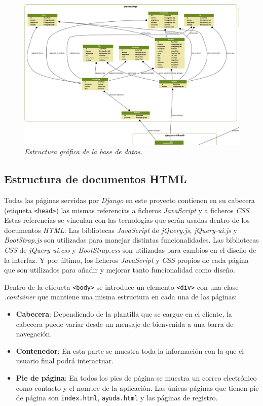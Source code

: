 \documentclass[a4paper, 12pt]{book}
\begin{document}
\begin{figure}
  \centering
  \includegraphics[width=17cm, keepaspectratio]{img/mis_modelos}
  \caption{\textit{Estructura gr\'afica de la base de datos.}}
  \label{fig:disenobbdd}
\end{figure}


\subsection{Estructura de documentos HTML} 
\label{sec:estructurahtml}
Todas las p\'aginas servidas por \textit{Django} en este proyecto contienen en su cabecera (etiqueta \texttt{<head>}) las mismas referencias a ficheros 
\textit{JavaScript} y a ficheros \textit{CSS}. Estas referencias se vinculan con las tecnolog\'ias que ser\'an usadas dentro de los documentos \textit{HTML}:
Las bibliotecas \textit{JavaScript} de \textit{jQuery.js}, \textit{jQuery-ui.js} y \textit{BootStrap.js} son utilizadas para manejar distintas 
funcionalidades. Las bibliotecas \textit{CSS} de \textit{jQuery-ui.css} y \textit{BootStrap.css} son utilizadas para cambios en el dise\~no de la interfaz. 
Y por \'ultimo, los ficheros \textit{JavaScript} y \textit{CSS} propios de cada p\'agina que son utilizados para a\~nadir y mejorar tanto funcionalidad 
como dise\~no.

Dentro de la etiqueta \texttt{<body>} se introduce un elemento \texttt{<div>} con una clase \textit{.container} que mantiene una misma estructura en cada 
una de las p\'aginas:
\begin{itemize}
  \item {\bfseries Cabecera}: Dependiendo de la plantilla que se cargue en el cliente, la cabecera puede variar desde un mensaje de bienvenida a una barra
  de navegaci\'on.
  \item {\bfseries Contenedor}: En esta parte se muestra toda la informaci\'on con la que el usuario final podr\'a interactuar.
  \item {\bfseries Pie de p\'agina}: En todos los pies de p\'agina se muestra un correo electr\'onico como contacto y el nombre de la aplicaci\'on. 
  Las \'unicas p\'aginas que tienen pie de p\'agina son \texttt{index.html}, \texttt{ayuda.html} y las p\'aginas de registro.
\end{itemize}
\end{document}

